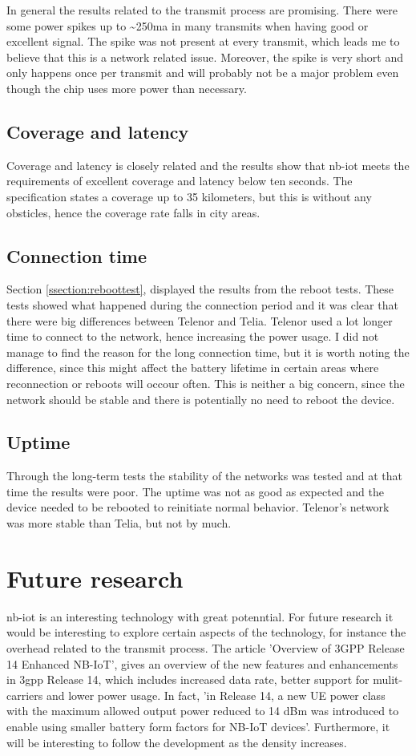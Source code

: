 \documentclass[USenglish]{ifimaster}  %
\begin{document}
In general the results related to the transmit process are promising. There were some power spikes up to \textasciitilde250\acrshort{ma} in many transmits when having good or excellent signal. The spike was not present at every transmit, which leads me to believe that this is a network related issue. Moreover, the spike is very short and only happens once per transmit and will probably not be a major problem even though the chip uses more power than necessary.

\subsection{Coverage and latency}
Coverage and latency is closely related and the results show that \acrshort{nb-iot} meets the requirements of excellent coverage and latency below ten seconds. The specification states a coverage up to 35 kilometers, but this is without any obsticles, hence the coverage rate falls in city areas.

\subsection{Connection time}
Section \vref{ssection:reboottest}, displayed the results from the reboot tests. These tests showed what happened during the connection period and it was clear that there were big differences between Telenor and Telia. Telenor used a lot longer time to connect to the network, hence increasing the power usage. I did not manage to find the reason for the long connection time, but it is worth noting the difference, since this might affect the battery lifetime in certain areas where reconnection or reboots will occour often. This is neither a big concern, since the network should be stable and there is potentially no need to reboot the device.

\subsection{Uptime}
Through the long-term tests the stability of the networks was tested and at that time the results were poor. The uptime was not as good as expected and the device needed to be rebooted to reinitiate normal behavior. Telenor's network was more stable than Telia, but not by much.

\section{Future research}
\acrshort{nb-iot} is an interesting technology with great potenntial. For future research it would be interesting to explore certain aspects of the technology, for instance the overhead related to the transmit process. The article 'Overview of 3GPP Release 14 Enhanced NB-IoT', gives an overview of the new features and enhancements in \acrshort{3gpp} Release 14, which includes increased data rate, better support for mulit-carriers and lower power usage. In fact, 'in Release 14, a new UE power class with the maximum allowed output power reduced to 14 dBm was introduced to enable using smaller battery form factors for NB-IoT devices'\cite{Overview74:online}. Furthermore, it will be interesting to follow the development as the density increases.
\end{document}
